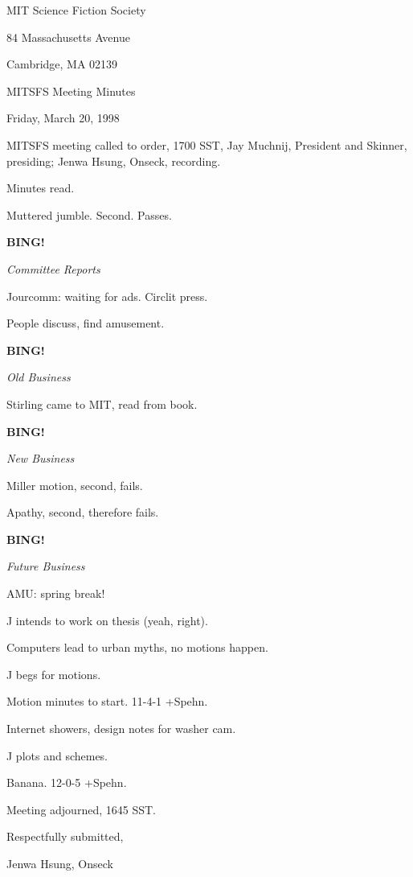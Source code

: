\documentclass[12pt]{article}
\newcommand{\bing}{{\bf BING!} }
\newcommand{\goto}[1]{\bing \vskip 12pt \centerline{{\em{#1}}}}
\begin{document}
\begin{center}

MIT Science Fiction Society 

84 Massachusetts Avenue

Cambridge, MA 02139

\vspace{12pt}

MITSFS Meeting Minutes 

Friday, March 20, 1998

\end{center}
 
\vspace{18pt}

\setlength{\parskip}{6pt}

\noindent
MITSFS meeting called to order, 1700 SST,
Jay Muchnij, President and Skinner, presiding; Jenwa Hsung, Onseck, recording.

Minutes read.

Muttered jumble. Second. Passes.

\goto{Committee Reports}

Jourcomm: waiting for ads. Circlit press.

People discuss, find amusement.

\goto{Old Business}

Stirling came to MIT, read from book.

\goto{New Business}

Miller motion, second, fails.

Apathy, second, therefore fails.

\goto{Future Business}

AMU: spring break!

J intends to work on thesis (yeah, right).

Computers lead to urban myths, no motions happen.

J begs for motions.

Motion minutes to start. 11-4-1 +Spehn.

Internet showers, design notes for washer cam.

J plots and schemes.

Banana. 12-0-5 +Spehn.

\vspace{12pt}

\noindent
Meeting adjourned, 1645 SST.

\vspace{18pt}

\centerline{Respectfully submitted,}
\centerline{Jenwa Hsung, Onseck}
\end{document}
